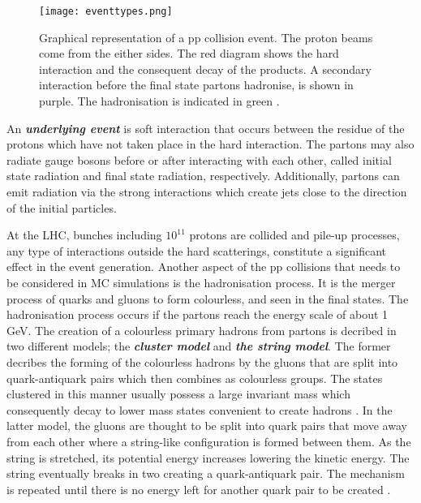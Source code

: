 \begin{figure}[ht]
	\centering
	\texttt{[image: eventtypes.png]}
	\vspace{2mm}
	\caption[Graphical representation of a pp collision event. The proton beams come from the either sides. The red diagram shows the hard interaction and the consequent decay of the products. A secondary interaction before the final state partons hadronise, is shown in purple. The hadronisation is indicated in green.]
	{Graphical representation of a pp collision event. The proton beams come from the either sides. The red diagram shows the hard interaction and the consequent decay of the products. A secondary interaction before the final state partons hadronise, is shown in purple. The hadronisation is indicated in green \cite{Pttgen2016}.}
	\label{eventtypes}
\end{figure}

An \emph{\bf{underlying event}} is soft interaction that occurs between the residue of the protons which have not taken place in the hard interaction. The partons may also radiate gauge bosons before or after interacting with each other, called initial state radiation and final state radiation, respectively. Additionally, partons can emit radiation via the strong interactions which create jets close to the direction of the initial particles.

At the LHC, bunches including $10^{11}$ protons are collided and pile-up processes, any type of interactions outside the hard scatterings, constitute a significant effect in the event generation. Another aspect of the pp collisions that needs to be considered in MC simulations is the hadronisation process. It is the merger process of quarks and gluons to form colourless, and seen in the final states. The hadronisation process occurs if the partons reach the energy scale of about 1 GeV. The creation of a colourless primary hadrons from partons is decribed in two different models; the \emph{\bf{cluster model}} and \emph{\bf{the string model}}. The former decribes the forming of the colourless hadrons by the gluons that are split into quark-antiquark pairs which then combines as colourless groups. The states clustered in this manner usually possess a large invariant mass which consequently decay to lower mass states convenient to create hadrons \cite{Webber1984}. In the latter model, the gluons are thought to be split into quark pairs that move away from each other where a string-like configuration is formed between them. As the string is stretched, its potential energy increases lowering the kinetic energy. The string eventually breaks in two creating a quark-antiquark pair. The mechanism is repeated until there is no energy left for another quark pair to be created \cite{Andersson1983}.

